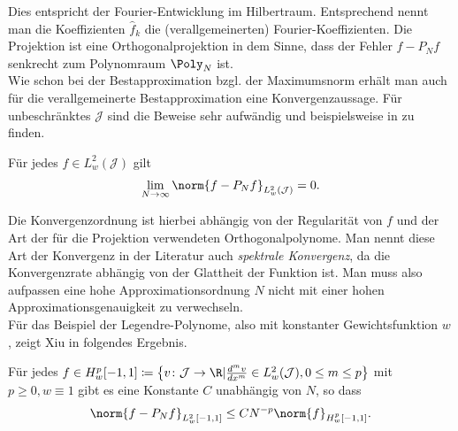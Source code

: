 Dies entspricht der Fourier-Entwicklung im Hilbertraum. Entsprechend nennt man die Koeffizienten $\hat{f}_k$ die (verallgemeinerten) Fourier-Koeffizienten. Die Projektion ist eine Orthogonalprojektion in dem Sinne, dass der Fehler $f-P_Nf$ senkrecht zum Polynomraum $\Poly_N$ ist.\\
Wie schon bei der Bestapproximation bzgl. der Maximumsnorm erhält man auch für die verallgemeinerte Bestapproximation eine Konvergenzaussage. Für unbeschränktes $\mathcal{J}$ sind die Beweise sehr aufwändig und beispielsweise in \autocite{CouHil53} zu finden. 
\begin{maththeorem}
Für jedes $f\in L_w^2(\mathcal{J})$ gilt
\[\lim\limits_{N\to\infty}\norm{f-P_Nf}_{L_w^2(\mathcal{J})}=0.\]
\end{maththeorem}
Die Konvergenzordnung ist hierbei abhängig von der Regularität von $f$ und der Art der für die Projektion verwendeten Orthogonalpolynome. Man nennt diese Art der Konvergenz in der Literatur auch \emph{spektrale Konvergenz}, da die Konvergenzrate abhängig von der Glattheit der Funktion ist. Man muss also aufpassen eine hohe Approximationsordnung $N$ nicht mit einer hohen Approximationsgenauigkeit zu verwechseln.\\
Für das Beispiel der Legendre-Polynome, also mit konstanter Gewichtsfunktion $w$, zeigt Xiu in \autocite[Theorem 3.6]{dongbinxiu2010} folgendes Ergebnis.
\begin{maththeorem}
\label{spectralconvth}
Für jedes $f\in H_w^p[-1,1]\coloneqq \left\lbrace v\colon \mathcal{J}\to\R | \frac{d^mv}{dx^m}\in L_w^2(\mathcal{J}),0\le m\le p\right\rbrace$ mit $p\ge 0, w\equiv 1$ gibt es eine Konstante $C$ unabhängig von $N$, so dass
\[\norm{f-P_Nf}_{L_w^2[-1,1]}\le CN^{-p}\norm{f}_{H_w^p[-1,1]}.\]
\end{maththeorem}

